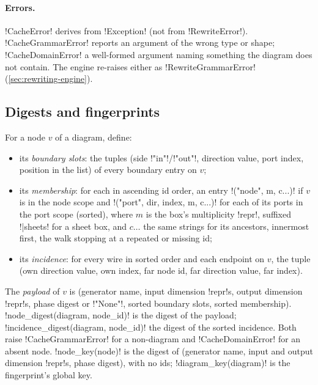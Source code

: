 \paragraph{Errors.}
\py!CacheError! derives from \py!Exception! (not from \py!RewriteError!).
\py!CacheGrammarError! reports an argument of the wrong type or shape; \py!CacheDomainError! a
well-formed argument naming something the diagram does not contain. The engine re-raises either as
\py!RewriteGrammarError! (\cref{sec:rewriting-engine}).

\subsection{Digests and fingerprints}

For a node $v$ of a diagram, define:
\begin{itemize}
\item its \emph{boundary slots}: the tuples (side \code!"in"!/\code!"out"!, direction value, port
  index, position in the list) of every boundary entry on $v$;
\item its \emph{membership}: for each \bbox{} in ascending id order, an entry
  \code!("node", m, c...)! if $v$ is in the node scope and \code!("port", dir, index, m, c...)! for
  each of its ports in the port scope (sorted), where $m$ is the box's multiplicity \py!repr!,
  suffixed \code!|sheets! for a sheet box, and $c\ldots$ the same strings for its ancestors,
  innermost first, the walk stopping at a repeated or missing id;
\item its \emph{incidence}: for every wire in sorted order and each endpoint on $v$, the tuple (own
  direction value, own index, far node id, far direction value, far index).
\end{itemize}
The \emph{payload} of $v$ is (generator name, input dimension \py!repr!s, output dimension
\py!repr!s, phase digest or \code!"None"!, sorted boundary slots, sorted membership).
\py!node_digest(diagram, node_id)! is the digest of the payload; \py!incidence_digest(diagram, node_id)!
the digest of the sorted incidence. Both raise \py!CacheGrammarError! for a non-diagram and
\py!CacheDomainError! for an absent node. \py!node_key(node)! is the digest of (generator name,
input and output dimension \py!repr!s, phase digest), with no ids; \py!diagram_key(diagram)! is
the fingerprint's global key.

